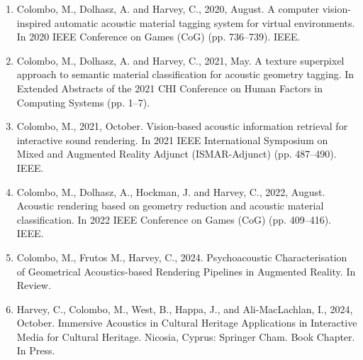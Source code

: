 \begin{enumerate}
    \item Colombo, M., Dolhasz, A. and Harvey, C., 2020, August. A computer vision-inspired automatic acoustic material tagging system for virtual environments. In 2020 IEEE Conference on Games (CoG) (pp. 736--739). IEEE.
    \item Colombo, M., Dolhasz, A. and Harvey, C., 2021, May. A texture superpixel approach to semantic material classification for acoustic geometry tagging. In Extended Abstracts of the 2021 CHI Conference on Human Factors in Computing Systems (pp. 1--7).
    \item Colombo, M., 2021, October. Vision-based acoustic information retrieval for interactive sound rendering. In 2021 IEEE International Symposium on Mixed and Augmented Reality Adjunct (ISMAR-Adjunct) (pp. 487--490). IEEE.
    \item Colombo, M., Dolhasz, A., Hockman, J. and Harvey, C., 2022, August. Acoustic rendering based on geometry reduction and acoustic material classification. In 2022 IEEE Conference on Games (CoG) (pp. 409--416). IEEE.
    \item Colombo, M., Frutos M., Harvey, C., 2024. Psychoacoustic Characterisation of Geometrical Acoustics-based Rendering Pipelines in Augmented Reality. In Review.
    \item Harvey, C., Colombo, M., West, B., Happa, J., and Ali-MacLachlan, I., 2024, October. Immersive Acoustics in Cultural Heritage Applications in Interactive Media for Cultural Heritage. Nicosia, Cyprus: Springer Cham. Book Chapter. In Press.
\end{enumerate}


